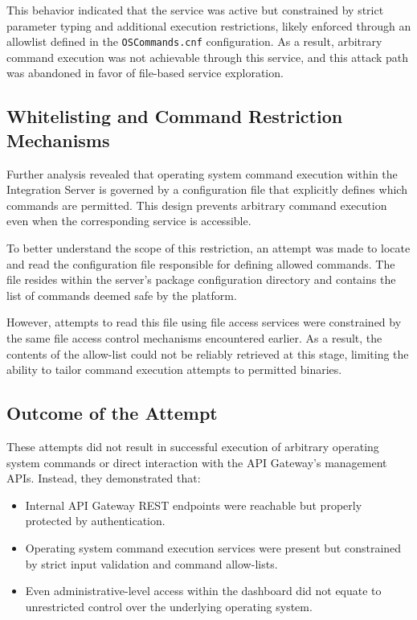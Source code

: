 \documentclass[12pt,a4paper]{report}
\begin{document}
This behavior indicated that the service was active but constrained by strict parameter typing and additional execution restrictions, likely enforced through an allowlist defined in the \texttt{OSCommands.cnf} configuration. As a result, arbitrary command execution was not achievable through this service, and this attack path was abandoned in favor of file-based service exploration.


\subsection{Whitelisting and Command Restriction Mechanisms}

Further analysis revealed that operating system command execution within the Integration Server is governed by a configuration file that explicitly defines which commands are permitted. This design prevents arbitrary command execution even when the corresponding service is accessible.

To better understand the scope of this restriction, an attempt was made to locate and read the configuration file responsible for defining allowed commands. The file resides within the server’s package configuration directory and contains the list of commands deemed safe by the platform.

However, attempts to read this file using file access services were constrained by the same file access control mechanisms encountered earlier. As a result, the contents of the allow-list could not be reliably retrieved at this stage, limiting the ability to tailor command execution attempts to permitted binaries.

\subsection{Outcome of the Attempt}

These attempts did not result in successful execution of arbitrary operating system commands or direct interaction with the API Gateway’s management APIs. Instead, they demonstrated that:

\begin{itemize}
	\item Internal API Gateway REST endpoints were reachable but properly protected by authentication.
	\item Operating system command execution services were present but constrained by strict input validation and command allow-lists.
	\item Even administrative-level access within the dashboard did not equate to unrestricted control over the underlying operating system.
\end{itemize}
\end{document}
